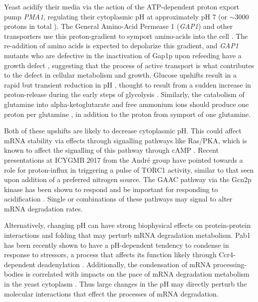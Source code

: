 Yeast acidify their media via the action of the ATP-dependent
proton export pump \textit{PMA1}, regulating their cytoplasmic pH
at approximately pH 7 (or $\sim$3000 protons in total 
\cite{orij2011intracellular}).
The General Amino-Acid Permease 1 (\textit{GAP1}) and other
transporters use this proton-gradient to symport amino-acids into
the cell \parencite{grenson1992amino}. 
The re-addition of amino acids is expected to depolarize this 
gradient, and \textit{GAP1} mutants who are defective in the 
inactivation of Gap1p upon refeeding have a growth defect
\parencite{risinger2006activity}, suggesting that the process of
active transport is what contributes to the defect in cellular 
metabolism and growth.
Glucose upshifts result in a rapid but transient reduction in pH
\parencite{kresnowati2008quantitative}, thought to result from
a sudden increase in proton-release during the early steps of 
glycolysis \parencite{orij2011intracellular}.
Similarly, the catabolism of glutamine into alpha-ketoglutarate
and free ammonium ions should produce one proton per glutamine
\parencite{magasanik2002nitrogen}, in addition to the proton
from symport of one glutamine.

Both of these upshifts are likely to decrease cytoplasmic pH.
This could affect mRNA stability via effects through signalling
pathways like Ras/PKA, which is known to affect the signalling
of this pathway through cAMP \parencite{orij2011intracellular}.
Recent presentations at ICYGMB 2017 from the Andr\'{e} group have
pointed towards a role for proton-influx in triggering a pulse of
TORC1 activity, similar to that seen upon addition of a preferred
nitrogen source. 
The GAAC pathway via the Gcn2p kinase has been shown to respond
and be important for responding to acidification 
\parencite{hueso2012novel}.
Single or combinations of these pathways may signal to alter
mRNA degradation rates.

Alternatively, changing pH can have strong biophysical effects on
protein-protein interactions and folding that may perturb mRNA
degradation metabolism. 
Pab1 has been recently shown to have a pH-dependent tendency to
condense in response to stressors, a process that affects its 
function likely through Ccr4-dependent deadenylation
\parencite{riback2017stress,yao2007pab1}.
Additionally, the condensation of mRNA processing-bodies is 
correlated with impacts on the pace of mRNA degradation metabolism 
in the yeast cytoplasm \parencite{huch2017mrna, rao2017numerous}.
Thus large changes in the pH may directly perturb the molecular
interactions that effect the processes of mRNA degradation.

